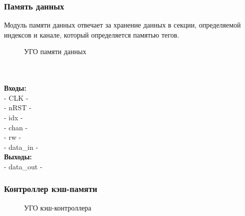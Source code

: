 \documentclass[13pt]{article}
\begin{document}
	\subsubsection{Память данных}
	Модуль памяти данных отвечает за хранение данных в секции, определяемой индексов и канале, который определяется памятью тегов.\\
	\begin{figure}[h!]
		\caption{УГО памяти данных}
	\end{figure}\\\\
	\textbf{Входы:}\\
	- CLK - \\
	- nRST - \\
	- idx - \\
	- chan - \\
	- rw - \\
	- data\_in - \\
	\textbf{Выходы:}\\
	- data\_out - \\
	\subsubsection{Контроллер кэш-памяти}
	\begin{figure}[h!]
		\caption{УГО кэш-контроллера}
	\end{figure}\\
\end{document}
